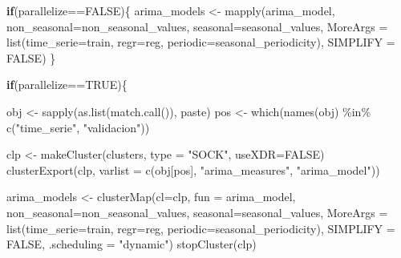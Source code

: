 \documentclass[
]{article}
\newenvironment{Shaded}{\begin{snugshade}}{\end{snugshade}}
\newcommand{\AttributeTok}[1]{\textcolor[rgb]{0.77,0.63,0.00}{#1}}
\newcommand{\ConstantTok}[1]{\textcolor[rgb]{0.00,0.00,0.00}{#1}}
\newcommand{\ControlFlowTok}[1]{\textcolor[rgb]{0.13,0.29,0.53}{\textbf{#1}}}
\newcommand{\FunctionTok}[1]{\textcolor[rgb]{0.00,0.00,0.00}{#1}}
\newcommand{\NormalTok}[1]{#1}
\newcommand{\OtherTok}[1]{\textcolor[rgb]{0.56,0.35,0.01}{#1}}
\newcommand{\SpecialCharTok}[1]{\textcolor[rgb]{0.00,0.00,0.00}{#1}}
\newcommand{\StringTok}[1]{\textcolor[rgb]{0.31,0.60,0.02}{#1}}
\begin{document}
\begin{Shaded}
\begin{Highlighting}[]
        \ControlFlowTok{if}\NormalTok{(parallelize}\SpecialCharTok{==}\ConstantTok{FALSE}\NormalTok{)\{}
\NormalTok{            arima\_models }\OtherTok{\textless{}{-}} \FunctionTok{mapply}\NormalTok{(arima\_model, }
                                   \AttributeTok{non\_seasonal=}\NormalTok{non\_seasonal\_values, }
                                   \AttributeTok{seasonal=}\NormalTok{seasonal\_values, }
                                   \AttributeTok{MoreArgs =} \FunctionTok{list}\NormalTok{(}\AttributeTok{time\_serie=}\NormalTok{train, }\AttributeTok{regr=}\NormalTok{reg, }
                                                   \AttributeTok{periodic=}\NormalTok{seasonal\_periodicity), }
                                   \AttributeTok{SIMPLIFY =} \ConstantTok{FALSE}\NormalTok{)}
\NormalTok{        \}}
        
        \ControlFlowTok{if}\NormalTok{(parallelize}\SpecialCharTok{==}\ConstantTok{TRUE}\NormalTok{)\{}
            

            
\NormalTok{            obj }\OtherTok{\textless{}{-}} \FunctionTok{sapply}\NormalTok{(}\FunctionTok{as.list}\NormalTok{(}\FunctionTok{match.call}\NormalTok{()), paste)}
\NormalTok{            pos }\OtherTok{\textless{}{-}} \FunctionTok{which}\NormalTok{(}\FunctionTok{names}\NormalTok{(obj) }\SpecialCharTok{\%in\%} \FunctionTok{c}\NormalTok{(}\StringTok{"time\_serie"}\NormalTok{, }\StringTok{"validacion"}\NormalTok{))}
            

\NormalTok{            clp }\OtherTok{\textless{}{-}} \FunctionTok{makeCluster}\NormalTok{(clusters, }\AttributeTok{type =} \StringTok{"SOCK"}\NormalTok{, }\AttributeTok{useXDR=}\ConstantTok{FALSE}\NormalTok{)}
            \FunctionTok{clusterExport}\NormalTok{(clp, }\AttributeTok{varlist =} \FunctionTok{c}\NormalTok{(obj[pos], }
                                           \StringTok{"arima\_measures"}\NormalTok{, }
                                           \StringTok{"arima\_model"}\NormalTok{))}
            

\NormalTok{            arima\_models }\OtherTok{\textless{}{-}} \FunctionTok{clusterMap}\NormalTok{(}\AttributeTok{cl=}\NormalTok{clp, }\AttributeTok{fun =}\NormalTok{ arima\_model, }
                                       \AttributeTok{non\_seasonal=}\NormalTok{non\_seasonal\_values, }
                                       \AttributeTok{seasonal=}\NormalTok{seasonal\_values, }
                                       \AttributeTok{MoreArgs =} \FunctionTok{list}\NormalTok{(}\AttributeTok{time\_serie=}\NormalTok{train, }
                                                       \AttributeTok{regr=}\NormalTok{reg, }
                                                       \AttributeTok{periodic=}\NormalTok{seasonal\_periodicity), }
                                       \AttributeTok{SIMPLIFY =} \ConstantTok{FALSE}\NormalTok{, }\AttributeTok{.scheduling =} \StringTok{"dynamic"}\NormalTok{)}
            \FunctionTok{stopCluster}\NormalTok{(clp)}
            

\end{Highlighting}
\end{Shaded}
\end{document}

